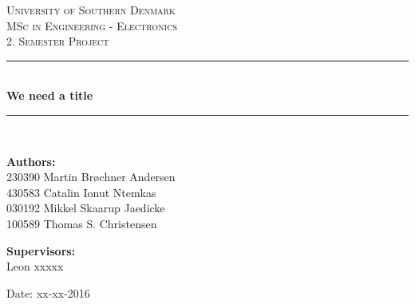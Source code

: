\begin{titlepage}
\begin{center}

\textsc{\LARGE University of Southern Denmark}\\[1.5cm]
\textsc{\Large MSc in Engineering - Electronics}\\
\textsc{\large 2. Semester Project}\\[0.5cm]

\vfill
\vspace{3cm}
\hrule ~\\[0.3cm]
{ \LARGE \bfseries We need a title\\[0.4cm] }
\hrule ~\\[1.5cm]

\vfill

\vspace{7cm}
\begin{minipage}[t]{.49\textwidth}
\begin{flushleft} \large
\textbf{Authors:}\\
230390 Martin Brøchner Andersen\\
430583 Catalin Ionut Ntemkas\\
030192 Mikkel Skaarup Jaedicke\\
100589 Thomas S. Christensen
\end{flushleft}
\end{minipage}
\begin{minipage}[t]{.49\textwidth}
\begin{flushright} \large
\textbf{Supervisors:} \\
Leon xxxxx
\end{flushright}
\end{minipage}

\vspace{1cm}
Date: xx-xx-2016

\vspace{1cm}

\end{center}
\end{titlepage}